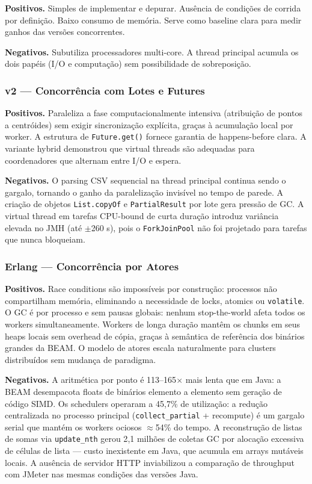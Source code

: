 \textbf{Positivos.}
Simples de implementar e depurar. Ausência de condições de corrida por definição.
Baixo consumo de memória. Serve como baseline clara para medir ganhos das versões
concorrentes.

\textbf{Negativos.}
Subutiliza processadores multi-core. A thread principal acumula os dois papéis
(I/O e computação) sem possibilidade de sobreposição.

\subsubsection*{v2 --- Concorrência com Lotes e Futures}

\textbf{Positivos.}
Paraleliza a fase computacionalmente intensiva (atribuição de pontos a centróides)
sem exigir sincronização explícita, graças à acumulação local por worker. A
estrutura de \texttt{Future.get()} fornece garantia de happens-before clara. A
variante hybrid demonstrou que virtual threads são adequadas para coordenadores
que alternam entre I/O e espera.

\textbf{Negativos.}
O parsing CSV sequencial na thread principal continua sendo o gargalo, tornando o
ganho da paralelização invisível no tempo de parede. A criação de objetos
\texttt{List.copyOf} e \texttt{PartialResult} por lote gera pressão de GC.
A virtual thread em tarefas CPU-bound de curta duração introduz variância elevada
no JMH (até $\pm$260 s), pois o \texttt{ForkJoinPool} não foi projetado para
tarefas que nunca bloqueiam.

\subsubsection*{Erlang --- Concorrência por Atores}

\textbf{Positivos.}
Race conditions são impossíveis por construção: processos não compartilham memória,
eliminando a necessidade de locks, atomics ou \texttt{volatile}. O GC é por
processo e sem pausas globais: nenhum stop-the-world afeta todos os workers
simultaneamente. Workers de longa duração mantêm os chunks em seus heaps locais
sem overhead de cópia, graças à semântica de referência dos binários grandes da
BEAM. O modelo de atores escala naturalmente para clusters distribuídos sem
mudança de paradigma.

\textbf{Negativos.}
A aritmética por ponto é 113--165$\times$ mais lenta que em Java: a BEAM
desempacota floats de binários elemento a elemento sem geração de código SIMD.
Os schedulers operaram a 45{,}7\% de utilização: a redução centralizada no processo
principal (\texttt{collect\_partial} + recompute) é um gargalo serial que mantém
os workers ociosos $\approx$54\% do tempo. A reconstrução de listas de somas via
\texttt{update\_nth} gerou 2{,}1 milhões de coletas GC por alocação excessiva de
células de lista --- custo inexistente em Java, que acumula em arrays mutáveis
locais. A ausência de servidor HTTP inviabilizou a comparação de throughput com
JMeter nas mesmas condições das versões Java.

